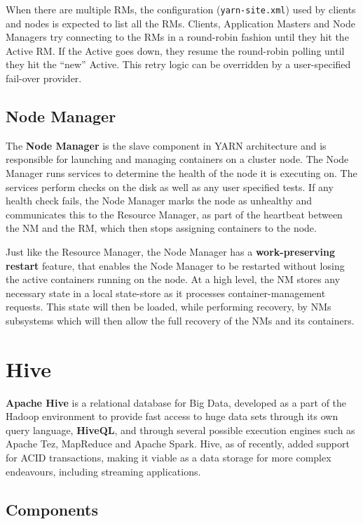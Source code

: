 When there are multiple RMs, the configuration (\texttt{yarn-site.xml}) used by clients and nodes is expected to list all the RMs. Clients, Application Masters and Node Managers try connecting to the RMs in a round-robin fashion until they hit the Active RM. If the Active goes down, they resume the round-robin polling until they hit the “new” Active. This retry logic can be overridden by a user-specified fail-over provider.

\subsection{Node Manager}

The \textbf{Node Manager} is the slave component in YARN architecture and is responsible for launching and managing containers on a cluster node. The Node Manager runs services to determine the health of the node it is executing on. The services perform checks on the disk as well as any user specified tests. If any health check fails, the Node Manager marks the node as unhealthy and communicates this to the Resource Manager, as part of the heartbeat between the NM and the RM, which then stops assigning containers to the node.

Just like the Resource Manager, the Node Manager has a \textbf{work-preserving restart} feature, that enables the Node Manager to be restarted without losing the active containers running on the node. At a high level, the NM stores any necessary state in a local state-store as it processes container-management requests. This state will then be loaded, while performing recovery, by NMs subsystems which will then allow the full recovery of the NMs and its containers.

\pagebreak
\section{Hive}

\textbf{Apache Hive} \cite{hive_doc} is a relational database for Big Data, developed as a part of the Hadoop environment to provide fast access to huge data sets through its own query language, \textbf{HiveQL}, and through several possible execution engines such as Apache Tez, MapReduce and Apache Spark. Hive, as of recently, added  support for ACID transactions, making it viable as a data storage for more complex endeavours, including streaming applications.

\subsection{Components}

